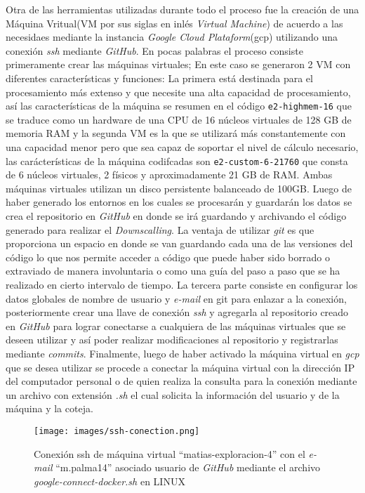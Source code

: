 Otra de las herramientas utilizadas durante todo el proceso fue la creación de una Máquina Vritual(VM por sus siglas en inlés \textit{Virtual Machine}) de acuerdo a las necesidaes mediante la instancia
\textit{Google Cloud Plataform}(gcp) utilizando una conexión \textit{ssh} mediante \textit{GitHub}. En pocas palabras el proceso consiste primeramente crear las máquinas virtuales;
En este caso se generaron 2 VM con diferentes características y funciones: La primera está destinada para el procesamiento más extenso y que necesite una alta capacidad de procesamiento, así
las características de la máquina se resumen en el código \texttt{e2-highmem-16} que se traduce como un hardware de una CPU de 16 núcleos virtuales de 128 GB de memoria RAM y la segunda VM es la que se utilizará
más constantemente con una capacidad menor pero que sea capaz de soportar el nivel de cálculo necesario, las carácterísticas de la máquina codifcadas son \texttt{e2-custom-6-21760} que consta de 6 núcleos virtuales,
2 físicos y aproximadamente 21 GB de RAM. Ambas máquinas virtuales utilizan un disco persistente balanceado de 100GB. Luego de haber generado los entornos en los cuales se procesarán y guardarán los datos se crea el repositorio en \textit{GitHub} en 
donde se irá guardando y archivando el código generado para realizar el \textit{Downscalling}. La ventaja de utilizar \textit{git} es que proporciona un espacio en donde se van guardando cada una de las versiones del código 
lo que nos permite acceder a código que puede haber sido borrado o extraviado de manera involuntaria o como una guía del paso a paso que se ha realizado en cierto intervalo de tiempo.
La tercera parte consiste en configurar los datos globales de nombre de usuario y \textit{e-mail} en git para
enlazar a la conexión, posteriormente crear una llave de conexión \textit{ssh} y agregarla al repositorio creado en \textit{GitHub} para lograr conectarse a cualquiera de las máquinas virtuales que se deseen utilizar y así poder realizar modificaciones 
al repositorio y registrarlas mediante \textit{commits}.
Finalmente, luego de haber activado la máquina virtual en \textit{gcp} que se desea utilizar se procede a conectar la máquina virtual con la dirección IP del computador personal o de quien realiza la consulta para la conexión
mediante un archivo con extensión \textit{.sh} el cual solicita la información del usuario y de la máquina y la coteja.


\begin{figure}[H]
    \centering
          \texttt{[image: images/ssh-conection.png]}
    \caption[Conexión ssh de máquina virtual]{\footnotesize Conexión ssh de máquina virtual ``matias-exploracion-4'' con el \textit{e-mail} ``m.palma14'' asociado usuario de \textit{GitHub} mediante el archivo \textit{google-connect-docker.sh} en LINUX}
\end{figure}

